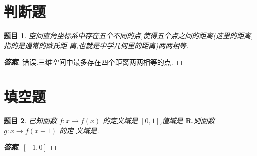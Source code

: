 \documentclass[a4paper]{article}
\newtheorem*{hypo}{题目}
\begin{document}
\section{判断题}
\label{sec:2}
\begin{hypo}
 空间直角坐标系中存在五个不同的点,使得五个点之间的距离(这里的距离,指的是通常的欧氏距
 离,也就是中学几何里的距离)两两相等.
\end{hypo}
\begin{proof}[\textbf{答案}]
  错误.三维空间中最多存在四个距离两两相等的点.
\end{proof}

\section{填空题}
\label{sec:3}
\begin{hypo}
  已知函数 $f:x\to f(x)$ 的定义域是 $[0,1]$,值域是 $\mathbf{R}$.则函数
  $g:x\to f(x+1)$ 的定
  义域是\underline{\hspace{1cm}}.
\end{hypo}
\begin{proof}[\textbf{答案}]
 $[-1,0]$
\end{proof}
\end{document}
